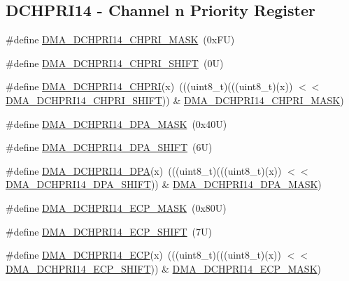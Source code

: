 \subsection*{D\+C\+H\+P\+R\+I14 -\/ Channel n Priority Register}
\begin{DoxyCompactItemize}
\item 
\#define \mbox{\hyperlink{group___d_m_a___register___masks_ga908ef8df8e7d76968f5aec7100551634}{D\+M\+A\+\_\+\+D\+C\+H\+P\+R\+I14\+\_\+\+C\+H\+P\+R\+I\+\_\+\+M\+A\+SK}}~(0x\+F\+U)
\item 
\#define \mbox{\hyperlink{group___d_m_a___register___masks_ga160b69c2c8a275120fefd8970b4731f5}{D\+M\+A\+\_\+\+D\+C\+H\+P\+R\+I14\+\_\+\+C\+H\+P\+R\+I\+\_\+\+S\+H\+I\+FT}}~(0\+U)
\item 
\#define \mbox{\hyperlink{group___d_m_a___register___masks_ga24845399db7f9ae5525e83c66afb7223}{D\+M\+A\+\_\+\+D\+C\+H\+P\+R\+I14\+\_\+\+C\+H\+P\+RI}}(x)~(((uint8\+\_\+t)(((uint8\+\_\+t)(x)) $<$$<$ \mbox{\hyperlink{group___d_m_a___register___masks_ga160b69c2c8a275120fefd8970b4731f5}{D\+M\+A\+\_\+\+D\+C\+H\+P\+R\+I14\+\_\+\+C\+H\+P\+R\+I\+\_\+\+S\+H\+I\+FT}})) \& \mbox{\hyperlink{group___d_m_a___register___masks_ga908ef8df8e7d76968f5aec7100551634}{D\+M\+A\+\_\+\+D\+C\+H\+P\+R\+I14\+\_\+\+C\+H\+P\+R\+I\+\_\+\+M\+A\+SK}})
\item 
\#define \mbox{\hyperlink{group___d_m_a___register___masks_ga73cb4f5a8c28574c6d7b9548811bde25}{D\+M\+A\+\_\+\+D\+C\+H\+P\+R\+I14\+\_\+\+D\+P\+A\+\_\+\+M\+A\+SK}}~(0x40\+U)
\item 
\#define \mbox{\hyperlink{group___d_m_a___register___masks_ga1dd167f78a3ed39d0858085f54286371}{D\+M\+A\+\_\+\+D\+C\+H\+P\+R\+I14\+\_\+\+D\+P\+A\+\_\+\+S\+H\+I\+FT}}~(6\+U)
\item 
\#define \mbox{\hyperlink{group___d_m_a___register___masks_ga24685cf64488773cf58df2428a91a1db}{D\+M\+A\+\_\+\+D\+C\+H\+P\+R\+I14\+\_\+\+D\+PA}}(x)~(((uint8\+\_\+t)(((uint8\+\_\+t)(x)) $<$$<$ \mbox{\hyperlink{group___d_m_a___register___masks_ga1dd167f78a3ed39d0858085f54286371}{D\+M\+A\+\_\+\+D\+C\+H\+P\+R\+I14\+\_\+\+D\+P\+A\+\_\+\+S\+H\+I\+FT}})) \& \mbox{\hyperlink{group___d_m_a___register___masks_ga73cb4f5a8c28574c6d7b9548811bde25}{D\+M\+A\+\_\+\+D\+C\+H\+P\+R\+I14\+\_\+\+D\+P\+A\+\_\+\+M\+A\+SK}})
\item 
\#define \mbox{\hyperlink{group___d_m_a___register___masks_gadcb3065c2c242e3728282cb36d891952}{D\+M\+A\+\_\+\+D\+C\+H\+P\+R\+I14\+\_\+\+E\+C\+P\+\_\+\+M\+A\+SK}}~(0x80\+U)
\item 
\#define \mbox{\hyperlink{group___d_m_a___register___masks_gaa7495718e9a8dc1cf79def8e6053472f}{D\+M\+A\+\_\+\+D\+C\+H\+P\+R\+I14\+\_\+\+E\+C\+P\+\_\+\+S\+H\+I\+FT}}~(7\+U)
\item 
\#define \mbox{\hyperlink{group___d_m_a___register___masks_gac340e6f28100e49a92e603daf4bcab42}{D\+M\+A\+\_\+\+D\+C\+H\+P\+R\+I14\+\_\+\+E\+CP}}(x)~(((uint8\+\_\+t)(((uint8\+\_\+t)(x)) $<$$<$ \mbox{\hyperlink{group___d_m_a___register___masks_gaa7495718e9a8dc1cf79def8e6053472f}{D\+M\+A\+\_\+\+D\+C\+H\+P\+R\+I14\+\_\+\+E\+C\+P\+\_\+\+S\+H\+I\+FT}})) \& \mbox{\hyperlink{group___d_m_a___register___masks_gadcb3065c2c242e3728282cb36d891952}{D\+M\+A\+\_\+\+D\+C\+H\+P\+R\+I14\+\_\+\+E\+C\+P\+\_\+\+M\+A\+SK}})
\end{DoxyCompactItemize}
